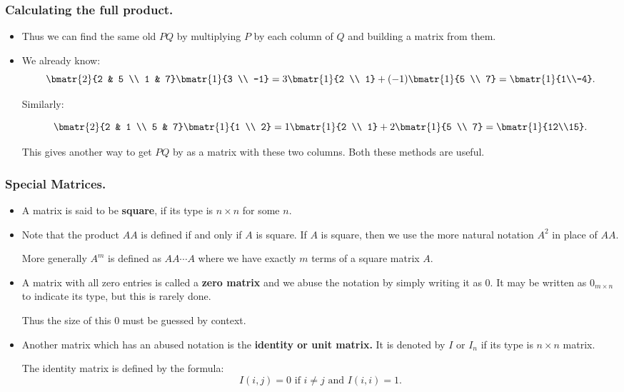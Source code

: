 \begin{frame}%
  \frametitle{Calculating the full product.}
  \begin{itemize}%

\item Thus we can find the same old $PQ$ by multiplying $P$ by each
column of $Q$ and building a matrix from them.

\item We already know: 
$$\bmatr{2}{2 & 5 \\ 1 & 7} \bmatr{1}{3 \\ -1} =
3\bmatr{1}{2 \\ 1} + (-1)\bmatr{1}{5 \\ 7} = \bmatr{1}{1\\-4}.$$

Similarly:

$$\bmatr{2}{2 & 1 \\ 5 & 7} \bmatr{1}{1 \\ 2} =
1\bmatr{1}{2 \\ 1} + 2\bmatr{1}{5 \\ 7} = \bmatr{1}{12\\15}.$$

This gives another way to get $PQ$ by as a matrix with these two
columns. Both these methods are useful.


\end{itemize}
\end{frame}


\begin{frame}%
  \frametitle{Special Matrices.}
  \begin{itemize}%
\item A matrix is said to be {\bf  square}, if its type is $n\times n$
for some $n$.

\item Note that the product $AA$ is defined if and only if $A$ is
square. If $A$ is square, then we use the more natural notation $A^2$ in
place of $AA$.

More generally $A^m$ is defined as $AA\cdots A$ where we have exactly
$m$ terms of a square matrix $A$.

\item
A matrix with all zero entries is called a {\bf zero matrix} and we
abuse the notation by simply writing it as $0$. It may be written as
$0_{m\times n}$ to indicate its type, but this is rarely done.

Thus the size of this $0$  must be guessed  by context.

\item Another matrix which has an abused notation is the {\bf identity
or unit matrix.} It is denoted by $I$ or $I_n$ if its type is
$n\times n$ matrix.

The identity matrix is defined by the formula:
$$I(i,j) = 0 \mbox{ if } i\neq j \mbox{ and } I(i,i)=1.$$

\end{itemize}
\end{frame}

